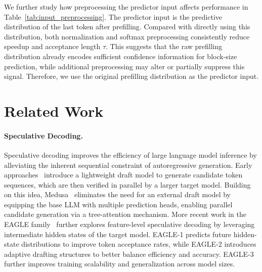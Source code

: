 \documentclass{llmxive}
\begin{document}
We further study how preprocessing the predictor input affects performance in Table~\ref{tab:input_preprocessing}. The predictor input is the predictive distribution of the last token after prefilling. Compared with directly using this distribution, both normalization and softmax preprocessing consistently reduce speedup and acceptance length $\tau$. This suggests that the raw prefilling distribution already encodes sufficient confidence information for block-size prediction, while additional preprocessing may alter or partially suppress this signal. Therefore, we use the original prefilling distribution as the predictor input.



\section{Related Work}
\paragraph{Speculative Decoding.}
Speculative decoding improves the efficiency of large language model inference by alleviating the inherent sequential constraint of autoregressive generation. Early approaches~\cite{leviathan2023fastinferencetransformersspeculative} introduce a lightweight draft model to generate candidate token sequences, which are then verified in parallel by a larger target model. Building on this idea, Medusa~\cite{cai2024medusasimplellminference} eliminates the need for an external draft model by equipping the base LLM with multiple prediction heads, enabling parallel candidate generation via a tree-attention mechanism. More recent work in the EAGLE family~\cite{li2025eaglespeculativesamplingrequires,li2024eagle2fasterinferencelanguage,li2025eagle3scalinginferenceacceleration} further explores feature-level speculative decoding by leveraging intermediate hidden states of the target model. EAGLE-1 predicts future hidden-state distributions to improve token acceptance rates, while EAGLE-2 introduces adaptive drafting structures to better balance efficiency and accuracy. EAGLE-3 further improves training scalability and generalization across model sizes.
\end{document}
